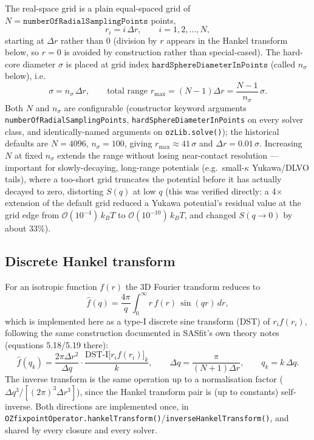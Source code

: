 \documentclass[11pt,a4paper]{article}
\newcommand{\code}[1]{\texttt{#1}}
\begin{document}
The real-space grid is a plain equal-spaced grid of $N=\code{numberOfRadialSamplingPoints}$
points,
\begin{equation}
  r_i = i\,\Delta r, \qquad i=1,2,\dots,N,
\end{equation}
starting at $\Delta r$ rather than $0$ (division by $r$ appears in the Hankel
transform below, so $r=0$ is avoided by construction rather than special-cased).
The hard-core diameter $\sigma$ is placed at grid index
$\code{hardSphereDiameterInPoints}$ (called $n_\sigma$ below), i.e.
\begin{equation}
  \sigma = n_\sigma\,\Delta r, \qquad
  \text{total range } r_{\max} = (N-1)\Delta r = \frac{N-1}{n_\sigma}\,\sigma.
\end{equation}
Both $N$ and $n_\sigma$ are configurable (constructor keyword arguments
\code{numberOfRadialSamplingPoints}, \code{hardSphereDiameterInPoints} on every
solver class, and identically-named arguments on \code{ozLib.solve()}); the
historical defaults are $N=4096$, $n_\sigma=100$, giving $r_{\max}\approx
41\,\sigma$ and $\Delta r = 0.01\,\sigma$. Increasing $N$ at fixed $n_\sigma$
extends the range without losing near-contact resolution --- important for
slowly-decaying, long-range potentials (e.g.\ small-$\kappa$ Yukawa/DLVO tails),
where a too-short grid truncates the potential before it has actually decayed
to zero, distorting $S(q)$ at low $q$ (this was verified directly: a 4$\times$
extension of the default grid reduced a Yukawa potential's residual value at
the grid edge from $\mathcal{O}(10^{-4})\,k_BT$ to $\mathcal{O}(10^{-10})\,k_BT$,
and changed $S(q\!\to\!0)$ by about 33\%).

\subsection{Discrete Hankel transform}

For an isotropic function $f(r)$ the 3D Fourier transform reduces to
\begin{equation}
  \hat f(q) = \frac{4\pi}{q}\int_0^\infty r\,f(r)\,\sin(qr)\,dr,
\end{equation}
which is implemented here as a type-I discrete sine transform (DST) of
$r_i f(r_i)$, following the same construction documented in SASfit's own
theory notes (equations 5.18/5.19 there):
\begin{equation}
  \hat f(q_k) = \frac{2\pi \Delta r^2}{\Delta q}\cdot
                \frac{\mathrm{DST\text{-}I}\big[r_i f(r_i)\big]_k}{k},
  \qquad
  \Delta q = \frac{\pi}{(N+1)\Delta r},
  \qquad q_k = k\,\Delta q.
\end{equation}
The inverse transform is the same operation up to a normalisation factor
($\Delta q^3/[(2\pi)^3\Delta r^3]$), since the Hankel transform pair is (up to
constants) self-inverse. Both directions are implemented once, in
\code{OZfixpointOperator.hankelTransform()}/\code{inverseHankelTransform()},
and shared by every closure and every solver.
\end{document}
